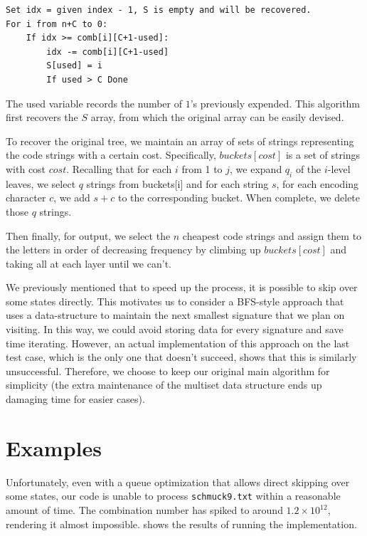\documentclass[a4paper,10pt,english]{scrartcl}
\begin{document}
\begin{verbatim}
Set idx = given index - 1, S is empty and will be recovered.
For i from n+C to 0:
    If idx >= comb[i][C+1-used]:
        idx -= comb[i][C+1-used]
        S[used] = i
        If used > C Done
\end{verbatim}

The used variable records the number of $1$'s previously expended. This algorithm first recovers the $S$ array, from which the original array can be easily devised.

To recover the original tree, we maintain an array of sets of strings representing the code strings with a certain cost. Specifically, $buckets[cost]$ is a set of strings with cost $cost$. Recalling that for each $i$ from 1 to $j$, we expand $q_i$ of the $i$-level leaves, we select $q$ strings from buckets[i] and for each string $s$, for each encoding character $c$, we add $s+c$ to the corresponding bucket. When complete, we delete those $q$ strings.

Then finally, for output, we select the $n$ cheapest code strings and assign them to the letters in order of decreasing frequency by climbing up $buckets[cost]$ and taking all at each layer until we can't.

We previously mentioned that to speed up the process, it is possible to skip over some states directly. This motivates us to consider a BFS-style approach that uses a data-structure to maintain the next smallest signature that we plan on visiting. In this way, we could avoid storing data for every signature and save time iterating. However, an actual implementation of this approach on the last test case, which is the only one that doesn't succeed, shows that this is similarly unsuccessful. Therefore, we choose to keep our original main algorithm for simplicity (the extra maintenance of the multiset data structure ends up damaging time for easier cases).

\section{Examples}\label{sec:examples}

Unfortunately, even with a queue optimization that allows direct skipping over some states, our code is unable to process \texttt{schmuck9.txt} within a reasonable amount of time. The combination number has spiked to around $1.2\times 10^{12}$, rendering it almost impossible.  shows the results of running the implementation.
\end{document}
